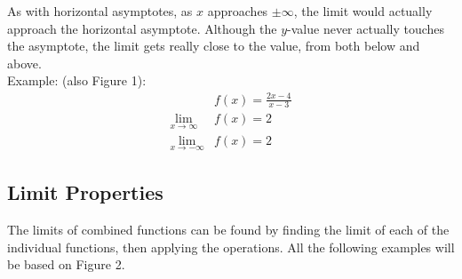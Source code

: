 \documentclass[12pt]{article}
\begin{document}
            As with horizontal asymptotes, as $x$ approaches $\pm \infty$, the limit would actually approach the horizontal asymptote. Although the $y$-value never actually touches the asymptote, the limit gets really close to the value, from both below and above.
            \\ Example: (also Figure 1):
            \begin{align*}
                &f(x) = \frac{2x-4}{x-3} \\
                \lim_{x \to \infty} &f(x) = 2 \\
                \lim_{x \to -\infty} &f(x) = 2
            \end{align*}

        \subsection{Limit Properties}
            The limits of combined functions can be found by finding the limit of each of the individual functions, then applying the operations. All the following examples will be based on Figure 2.
            \begin{figure}[H]
                \begin{center}
                    \caption[Figure 2]{}
                \end{center}
            \end{figure}
\end{document}
